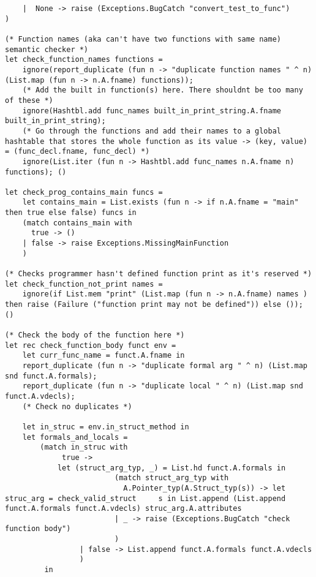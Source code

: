 \documentclass{article}
\begin{document}
\begin{lstlisting}
	|  None -> raise (Exceptions.BugCatch "convert_test_to_func")
)

(* Function names (aka can't have two functions with same name) semantic checker *)
let check_function_names functions = 
	ignore(report_duplicate (fun n -> "duplicate function names " ^ n) (List.map (fun n -> n.A.fname) functions));	
	(* Add the built in function(s) here. There shouldnt be too many of these *)
	ignore(Hashtbl.add func_names built_in_print_string.A.fname built_in_print_string);
	(* Go through the functions and add their names to a global hashtable that stores the whole function as its value -> (key, value) = (func_decl.fname, func_decl) *)
	ignore(List.iter (fun n -> Hashtbl.add func_names n.A.fname n) functions); ()

let check_prog_contains_main funcs =
	let contains_main = List.exists (fun n -> if n.A.fname = "main" then true else false) funcs in
	(match contains_main with
	  true -> ()
	| false -> raise Exceptions.MissingMainFunction
	)

(* Checks programmer hasn't defined function print as it's reserved *)
let check_function_not_print names = 
	ignore(if List.mem "print" (List.map (fun n -> n.A.fname) names ) then raise (Failure ("function print may not be defined")) else ()); ()

(* Check the body of the function here *)
let rec check_function_body funct env =
	let curr_func_name = funct.A.fname in
	report_duplicate (fun n -> "duplicate formal arg " ^ n) (List.map snd funct.A.formals);
	report_duplicate (fun n -> "duplicate local " ^ n) (List.map snd funct.A.vdecls);
	(* Check no duplicates *)

	let in_struc = env.in_struct_method in
	let formals_and_locals =
		(match in_struc with
			 true ->
			let (struct_arg_typ, _) = List.hd funct.A.formals in
                         (match struct_arg_typ with
                           A.Pointer_typ(A.Struct_typ(s)) -> let struc_arg = check_valid_struct     s in List.append (List.append funct.A.formals funct.A.vdecls) struc_arg.A.attributes
                         | _ -> raise (Exceptions.BugCatch "check function body")
                         )
                 | false -> List.append funct.A.formals funct.A.vdecls
                 )
         in


\end{lstlisting}
\end{document}
